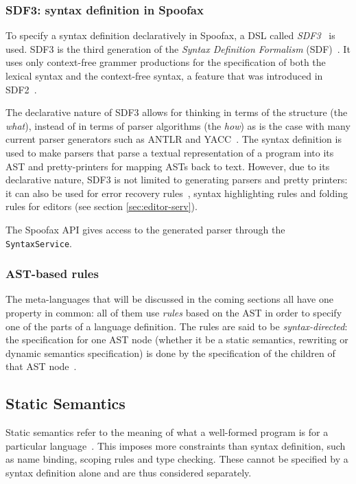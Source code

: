 \subsubsection{SDF3: syntax definition in Spoofax}
\label{sec:orgheadline1}
To specify a syntax definition declaratively in Spoofax, a DSL called
\emph{SDF3}~\cite{Vollebregt12} is used.  SDF3 is the third generation
of the \emph{Syntax Definition Formalism} (SDF)~\cite{Heering89}. It
uses only context-free grammer productions for the specification of
both the lexical syntax and the context-free syntax, a feature that
was introduced in SDF2~\cite{Visser97}.

The declarative nature of SDF3 allows for thinking in terms of the
structure (the \emph{what}), instead of in terms of parser algorithms (the
\emph{how}) as is the case with many current parser generators such as
ANTLR and YACC~\cite{Kats10b}. The syntax definition is used to
make parsers that parse a textual representation of a program into its
AST and pretty-printers for mapping ASTs back to text. However, due to
its declarative nature, SDF3 is not limited to generating parsers and
pretty printers: it can also be used for error recovery
rules~\cite{deJonge12}, syntax highlighting rules and folding
rules for editors (see section \ref{sec:editor-serv}).

The Spoofax API gives access to the generated parser through the
\texttt{SyntaxService}.
\subsubsection{AST-based rules}
\label{sec:orgheadline2}
The meta-languages that will be discussed in the coming sections all
have one property in common: all of them use \emph{rules} based on the AST
in order to specify one of the parts of a language definition. The
rules are said to be \emph{syntax-directed}: the specification for one AST
node (whether it be a static semantics, rewriting or dynamic semantics
specification) is done by the specification of the children of that
AST node~\cite{Winskel93}.
\subsection{Static Semantics}
\label{sec:static-analysis}
Static semantics refer to the meaning of what a well-formed program is
for a particular language~\cite{Milner97}. This imposes more
constraints than syntax definition, such as name binding, scoping
rules and type checking. These cannot be specified by a syntax
definition alone and are thus considered separately.
